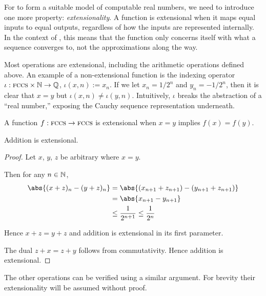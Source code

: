 \documentclass[leqno]{report}
\begin{document}

For \FCCS{} to form a suitable model of computable real numbers, we need to introduce one more property: \textit{extensionality}. A function is extensional when it maps equal inputs to equal outputs, regardless of how the inputs are represented internally. In the context of \FCCS, this means that the function only concerns itself with what a sequence converges to, not the approximations along the way.

Most operations are extensional, including the arithmetic operations defined above. An example of a non-extensional function is the indexing operator $\iota : \textsc{fccs} \times \mathbb{N} \rightarrow \mathbb{Q}$, $\iota(x, n) := x_n$. If we let $x_n = 1/2^n$ and $y_n = -1/2^n$, then it is clear that $x = y$ but $\iota(x, n) \neq \iota(y, n)$. Intuitively, $\iota$ breaks the abstraction of a ``real number,'' exposing the Cauchy sequence representation underneath.

\begin{Definition}[Extensionality]
    A function $f : \textsc{fccs} \rightarrow \textsc{fccs}$ is extensional when $x = y$ implies $f(x) = f(y)$.
\end{Definition}

\begin{Proposition}
    Addition is extensional.
\end{Proposition}

\begin{proof}
    Let $x$, $y$, $z$ be arbitrary \FCCS{} where $x = y$.

    Then for any $n \in \mathbb{N}$,
    \begin{align*}
        \abs{ (x + z)_n - (y + z)_n }
        &= \abs{ (x_{n+1} + z_{n+1}) - (y_{n+1} + z_{n+1}) } \\
        &= \abs{ x_{n+1} - y_{n+1} } \\
        &\leq \frac{1}{2^{n+1}} \leq \frac{1}{2^n}
    \end{align*}

    Hence $x + z = y + z$ and addition is extensional in its first parameter.

    The dual $z + x = z + y$ follows from commutativity. Hence addition is extensional.
\end{proof}

The other operations can be verified using a similar argument. For brevity their extensionality will be assumed without proof.
\end{document}
